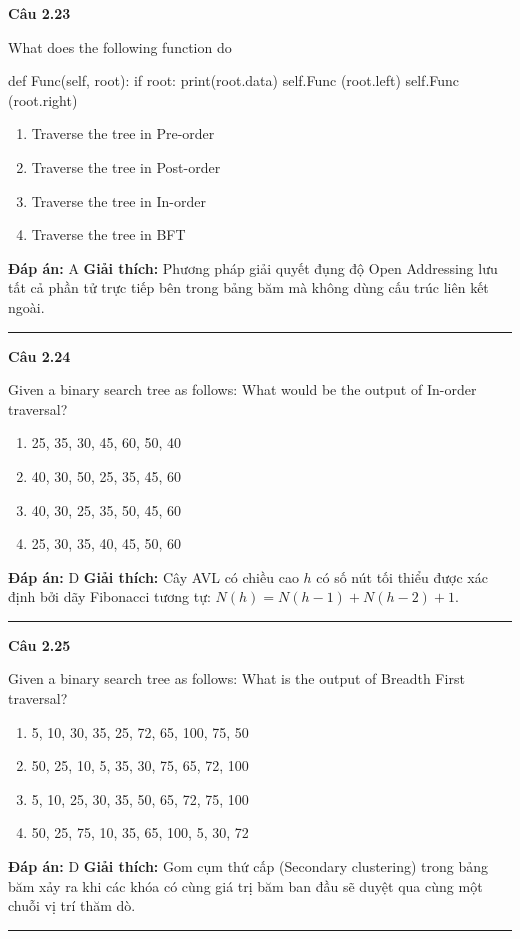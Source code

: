 \documentclass[11pt,a4paper]{article}
\newenvironment{question}[1]{%
  \par\vspace{1em}\noindent\textbf{\large Câu #1}\par\vspace{0.4em}
}{%
  \par\vspace{1em}\hrule\vspace{0.6em}
}
\newenvironment{choices}{%
  \begin{enumerate}[label=\textbf{\Alph*.},leftmargin=2.2em,itemsep=2pt,topsep=3pt]
}{%
  \end{enumerate}
}
\newcommand{\choice}{\item}
\newenvironment{codebox}{%
  \begin{tcolorbox}[colback=gray!8!white,colframe=gray!50!black,arc=1.5mm,boxrule=0.6pt,left=3mm,right=3mm,top=2.5mm,bottom=2.5mm]
  \ttfamily\small
}{%
  \end{tcolorbox}
}
\begin{document}
\begin{question}{2.23}
What does the following function do
\begin{codebox}
def Func(self, root):
    if root:
        print(root.data)
        self.Func (root.left)
        self.Func (root.right)
\end{codebox}
\begin{choices}
\choice Traverse the tree in Pre-order
\choice Traverse the tree in Post-order
\choice Traverse the tree in In-order
\choice Traverse the tree in BFT
\end{choices}
\textbf{Đáp án:} A
\textbf{Giải thích:} Phương pháp giải quyết đụng độ Open Addressing lưu tất cả phần tử trực tiếp bên trong bảng băm mà không dùng cấu trúc liên kết ngoài.
\end{question}

\begin{question}{2.24}
Given a binary search tree as follows: What would be the output of In-order traversal?
\begin{choices}
\choice 25, 35, 30, 45, 60, 50, 40
\choice 40, 30, 50, 25, 35, 45, 60
\choice 40, 30, 25, 35, 50, 45, 60
\choice 25, 30, 35, 40, 45, 50, 60
\end{choices}
\textbf{Đáp án:} D
\textbf{Giải thích:} Cây AVL có chiều cao $h$ có số nút tối thiểu được xác định bởi dãy Fibonacci tương tự: $N(h) = N(h-1) + N(h-2) + 1$.
\end{question}

\begin{question}{2.25}
Given a binary search tree as follows:
What is the output of Breadth First traversal?
\begin{center}
\end{center}
\begin{choices}
\choice 5, 10, 30, 35, 25, 72, 65, 100, 75, 50
\choice 50, 25, 10, 5, 35, 30, 75, 65, 72, 100
\choice 5, 10, 25, 30, 35, 50, 65, 72, 75, 100
\choice 50, 25, 75, 10, 35, 65, 100, 5, 30, 72
\end{choices}
\textbf{Đáp án:} D
\textbf{Giải thích:} Gom cụm thứ cấp (Secondary clustering) trong bảng băm xảy ra khi các khóa có cùng giá trị băm ban đầu sẽ duyệt qua cùng một chuỗi vị trí thăm dò.
\end{question}
\end{document}
